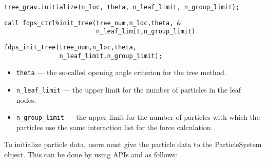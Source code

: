 \ifCpp %
\begin{lstlisting}[caption=Initialization of \textsf{Tree} object]
tree_grav.initialize(n_loc, theta, n_leaf_limit, n_group_limit);
\end{lstlisting}
\endifCpp
\ifFtn %
\begin{lstlisting}[caption=Initialization of \textsf{Tree} object]
call fdps_ctrl%init_tree(tree_num,n_loc,theta, &
                         n_leaf_limit,n_group_limit)
\end{lstlisting}
\endifFtn
\ifC %
\begin{lstlisting}[caption=Initialization of \textsf{Tree} object]
fdps_init_tree(tree_num,n_loc,theta,
               n_leaf_limit,n_group_limit);
\end{lstlisting}
\endifC

\begin{itemize}[leftmargin=*,topsep=-1ex,parsep=-1ex]
\item \texttt{theta} --- the so-called opening angle criterion for the tree method.
\item \texttt{n\_leaf\_limit} --- the upper limit for the number of particles in the leaf nodes.
\item \texttt{n\_group\_limit} --- the upper limit for the number of particles with which the particles use the same interaction list for the force calculation.
\end{itemize}


\ifIF %
\label{s3sec:nbody_initialize_ptcl_data}
To initialize particle data, users must give the particle data to the \textsf{ParticleSystem} object. This can be done by using APIs  and  as follows:


